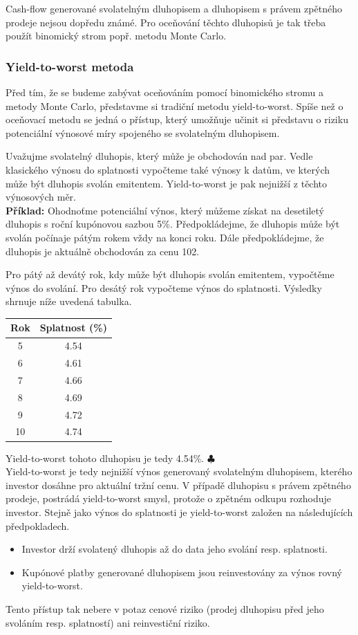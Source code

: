 \documentclass[a4paper]{book}
\begin{document}
Cash-flow generované svolatelným dluhopisem a dluhopisem s právem zpětného prodeje nejsou dopředu známé. Pro oceňování těchto dluhopisů je tak třeba použít binomický strom popř. metodu Monte Carlo.

\subsubsection{Yield-to-worst metoda}

Před tím, že se budeme zabývat oceňováním pomocí binomického stromu a metody Monte Carlo, představme si tradiční metodu yield-to-worst. Spíše než o oceňovací metodu se jedná o přístup, který umožňuje učinit si představu o riziku potenciální výnosové míry spojeného se svolatelným dluhopisem.

Uvažujme svolatelný dluhopis, který může je obchodován nad par. Vedle klasického výnosu do splatnosti vypočteme také výnosy k datům, ve kterých může být dluhopis svolán emitentem. Yield-to-worst je pak nejnižší z těchto výnosových měr.\\

\noindent \textbf{Příklad:} Ohodnoťme potenciální výnos, který můžeme získat na desetiletý dluhopis s roční kupónovou sazbou 5\%. Předpokládejme, že dluhopis může být svolán počínaje pátým rokem vždy na konci roku. Dále předpokládejme, že dluhopis je aktuálně obchodován za cenu 102.

Pro pátý až devátý rok, kdy může být dluhopis svolán emitentem, vypočtěme výnos do svolání. Pro desátý rok vypočteme výnos do splatnosti. Výsledky shrnuje níže uvedená tabulka.
\begin{center}
\begin{tabular}{c c}
\textbf{Rok} & \textbf{Splatnost (\%)} \\
\hline
5  & 4.54 \\
6  & 4.61 \\
7  & 4.66 \\
8  & 4.69 \\
9  & 4.72 \\
10 & 4.74 \\
\end{tabular}
\end{center}
Yield-to-worst tohoto dluhopisu je tedy 4.54\%. $\clubsuit$\\

Yield-to-worst je tedy nejnižší výnos generovaný svolatelným dluhopisem, kterého investor dosáhne pro aktuální tržní cenu. V případě dluhopisu s právem zpětného prodeje, postrádá yield-to-worst smysl, protože o zpětném odkupu rozhoduje investor. Stejně jako výnos do splatnosti je yield-to-worst založen na následujících předpokladech.
\begin{itemize}
\item Investor drží svolatený dluhopis až do data jeho svolání resp. splatnosti.
\item Kupónové platby generované dluhopisem jsou reinvestovány za výnos rovný yield-to-worst.
\end{itemize}
Tento přístup tak nebere v potaz cenové riziko (prodej dluhopisu před jeho svoláním resp. splatností) ani reinvestiční riziko.
\end{document}

